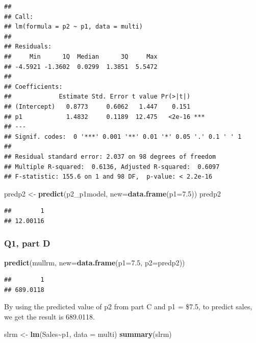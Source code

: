 \documentclass[
]{article}
\newenvironment{Shaded}{\begin{snugshade}}{\end{snugshade}}
\newcommand{\AttributeTok}[1]{\textcolor[rgb]{0.13,0.29,0.53}{#1}}
\newcommand{\FloatTok}[1]{\textcolor[rgb]{0.00,0.00,0.81}{#1}}
\newcommand{\FunctionTok}[1]{\textcolor[rgb]{0.13,0.29,0.53}{\textbf{#1}}}
\newcommand{\NormalTok}[1]{#1}
\newcommand{\OtherTok}[1]{\textcolor[rgb]{0.56,0.35,0.01}{#1}}
\newcommand{\SpecialCharTok}[1]{\textcolor[rgb]{0.81,0.36,0.00}{\textbf{#1}}}
\begin{document}
\begin{verbatim}
## 
## Call:
## lm(formula = p2 ~ p1, data = multi)
## 
## Residuals:
##     Min      1Q  Median      3Q     Max 
## -4.5921 -1.3602  0.0299  1.3851  5.5472 
## 
## Coefficients:
##             Estimate Std. Error t value Pr(>|t|)    
## (Intercept)   0.8773     0.6062   1.447    0.151    
## p1            1.4832     0.1189  12.475   <2e-16 ***
## ---
## Signif. codes:  0 '***' 0.001 '**' 0.01 '*' 0.05 '.' 0.1 ' ' 1
## 
## Residual standard error: 2.037 on 98 degrees of freedom
## Multiple R-squared:  0.6136, Adjusted R-squared:  0.6097 
## F-statistic: 155.6 on 1 and 98 DF,  p-value: < 2.2e-16
\end{verbatim}

\begin{Shaded}
\begin{Highlighting}[]
\NormalTok{predp2 }\OtherTok{\textless{}{-}} \FunctionTok{predict}\NormalTok{(p2\_p1model, }\AttributeTok{new=}\FunctionTok{data.frame}\NormalTok{(}\AttributeTok{p1=}\FloatTok{7.5}\NormalTok{))}
\NormalTok{predp2}
\end{Highlighting}
\end{Shaded}

\begin{verbatim}
##        1 
## 12.00116
\end{verbatim}

\subsubsection{Q1, part D}\label{q1-part-d}

\begin{Shaded}
\begin{Highlighting}[]
\FunctionTok{predict}\NormalTok{(mullrm, }\AttributeTok{new=}\FunctionTok{data.frame}\NormalTok{(}\AttributeTok{p1=}\FloatTok{7.5}\NormalTok{, }\AttributeTok{p2=}\NormalTok{predp2))}
\end{Highlighting}
\end{Shaded}

\begin{verbatim}
##        1 
## 689.0118
\end{verbatim}

By using the predicted value of p2 from part C and p1 = \$7.5, to
predict sales, we get the result is 689.0118.

\begin{Shaded}
\begin{Highlighting}[]
\NormalTok{slrm }\OtherTok{\textless{}{-}} \FunctionTok{lm}\NormalTok{(Sales}\SpecialCharTok{\textasciitilde{}}\NormalTok{p1, }\AttributeTok{data =}\NormalTok{ multi)}
\FunctionTok{summary}\NormalTok{(slrm)}
\end{Highlighting}
\end{Shaded}
\end{document}
